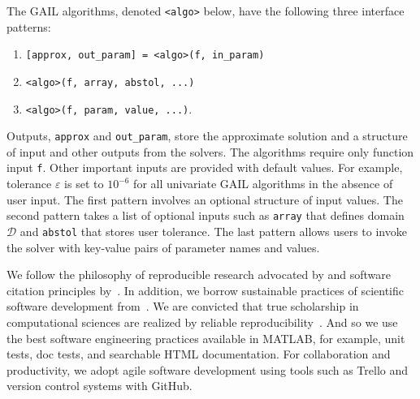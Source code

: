 The GAIL algorithms, denoted \texttt{<algo>} below, have the following
three interface patterns:  
\begin{enumerate}  [label=\roman*.]
\item \texttt{[approx, out\_param] = <algo>(f, in\_param)} 
\item \texttt{<algo>(f, array, abstol, ...)} 
\item \texttt{<algo>(f, \textquotesingle param\textquotesingle, value, ...)}.
\end{enumerate}
Outputs, \texttt{approx} and \texttt{out\_param}, store the approximate
solution and a structure of input and other outputs from the solvers. The
algorithms require only function input \texttt{f}. Other important inputs
are provided with default values. 
For example, tolerance $\varepsilon$ is
set to $10^{-6}$ for all univariate GAIL algorithms in the absence of user input. 
The first pattern involves
an optional structure of input values. The second pattern takes a list of
optional inputs such as \texttt{array} that defines domain $\mathcal{D}$
and \texttt{abstol} that stores user tolerance. The last pattern allows
users to invoke the solver with key-value pairs of parameter names and
values.


We follow the philosophy of reproducible research advocated by \cite{SEP1, 
BD95} and software citation principles by~\cite{smith2016software}.
In addition, we borrow sustainable practices of scientific software
development from~\cite{KCNN15,KCWH16,KCLM14}. We are convicted that true
scholarship in computational sciences are realized by reliable
reproducibility~\cite{C14a,CH13}. And so we use the best software
engineering practices available in MATLAB, for example,  unit tests, doc
tests, and searchable HTML documentation. For collaboration and
productivity, we adopt agile software development using tools such as
Trello and version control systems with GitHub. 

